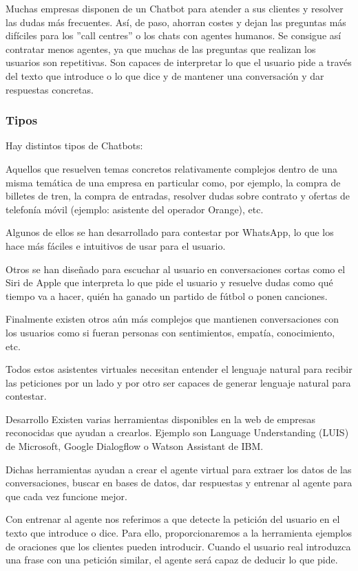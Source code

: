 Muchas empresas disponen de un Chatbot para atender a sus clientes y resolver las dudas más frecuentes. Así, de paso, ahorran costes y dejan las preguntas más difíciles para los ''call centres'' o los chats con agentes humanos. Se consigue así contratar menos agentes, ya que muchas de las preguntas que realizan los usuarios son repetitivas. Son capaces de interpretar lo que el usuario pide a través del texto que introduce o lo que dice y de mantener una conversación y dar respuestas concretas. 

\subsubsection{Tipos}

Hay distintos tipos de Chatbots:

Aquellos que resuelven temas concretos relativamente complejos dentro de una misma temática de una empresa en particular como, por ejemplo, la compra de billetes de tren, la compra de entradas, resolver dudas sobre contrato y ofertas de telefonía móvil (ejemplo: asistente del operador Orange), etc.

Algunos de ellos se han desarrollado para contestar por WhatsApp, lo que los hace más fáciles e intuitivos de usar para el usuario.

Otros se han diseñado para escuchar al usuario en conversaciones cortas como el Siri de Apple que interpreta lo que pide el usuario y resuelve dudas como qué tiempo va a hacer, quién ha ganado un partido de fútbol o ponen canciones.

Finalmente existen otros aún más complejos que mantienen conversaciones con los usuarios como si fueran personas con sentimientos, empatía, conocimiento, etc.

Todos estos asistentes virtuales necesitan entender el lenguaje natural para recibir las peticiones por un lado y por otro ser capaces de generar lenguaje natural para contestar. 


Desarrollo
Existen varias herramientas disponibles en la web de empresas reconocidas que ayudan a crearlos. Ejemplo son Language Understanding (LUIS) de Microsoft, Google Dialogflow o Watson Assistant de IBM.

Dichas herramientas ayudan a crear el agente virtual para extraer los datos de las conversaciones, buscar en bases de datos, dar respuestas y entrenar al agente para que cada vez funcione mejor.

Con entrenar al agente nos referimos a que detecte la petición del usuario en el texto que introduce o dice. Para ello, proporcionaremos a la herramienta ejemplos de oraciones que los clientes pueden introducir. Cuando el usuario real introduzca una frase con una petición similar, el agente será capaz de deducir lo que pide.


